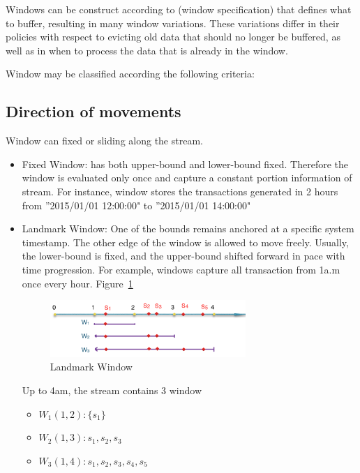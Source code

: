 Windows can be construct according to (window specification) that defines what to buffer, resulting in many window variations. These variations differ in their policies with respect to evicting old data that should no longer be buffered, as well as in when to process the data that is already in the window.\citep{Henrique:2014}


Window may be classified according the following criteria:

\subsection{Direction of movements}
Window can fixed or sliding along the stream.
\begin{itemize}

\item Fixed Window:  has both upper-bound and lower-bound fixed. Therefore the window is evaluated only once and capture a constant portion information of stream. For instance, window stores the transactions generated in 2 hours from ''2015/01/01 12:00:00" to ''2015/01/01 14:00:00"

\item Landmark Window: One of the bounds remains  anchored at a specific system timestamp. The other edge of the window is allowed to move freely. Usually, the lower-bound is fixed, and the upper-bound shifted forward in pace with time progression.
For example, windows capture all transaction from 1a.m once every hour. Figure~\ref{fig:landMarkWin}

\begin{figure}[htbp!] 
\centering    
\includegraphics[width=0.7\textwidth]{landMarkWin}
\caption{Landmark Window}
\label{fig:landMarkWin}
\end{figure}

Up to 4am, the stream contains 3 window 
\begin{itemize}
\item $W_1(1,2):\{s_1\}$ 
\item $W_2(1,3):{s_1, s_2, s_3}$ 
\item $W_3(1,4):{s_1, s_2, s_3, s_4,s_5}$ 
\end{itemize}


\end{itemize}
